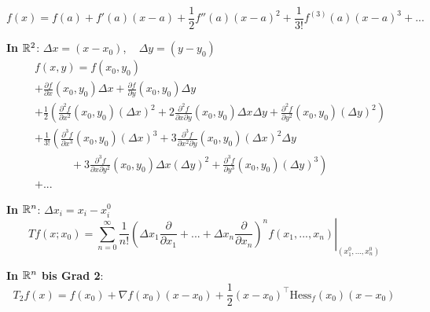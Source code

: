 \[
    f(x) = f(a) + f'(a)(x-a) + \frac{1}{2} f''(a)(x-a)^2 + \frac{1}{3!} f^{(3)}(a)(x-a)^3 + ...
\]

\textbf{In $\mathbb{R}^2$}: $\Delta x = (x - x_0)$, ~ $\Delta y = (y - y_0)$
\begin{align*}
    \; & f(x, y) =f(x_0, y_0)\\ &+ \frac{\partial f}{\partial x}(x_0,y_0) \Delta x + \frac{\partial f}{\partial y}(x_0,y_0) \Delta y\\
    &+ \frac{1}{2} \left(\frac{\partial^2 f}{\partial x^2}(x_0,y_0) (\Delta x)^2 + 2\frac{\partial^2 f}{\partial x \partial y}(x_0,y_0) \Delta x \Delta y + \frac{\partial^2 f}{\partial y^2}(x_0,y_0) (\Delta y)^2\right)\\
    &+ \frac{1}{3!} \left(\frac{\partial^3 f}{\partial x^3}(x_0,y_0) (\Delta x)^3 + 3\frac{\partial^3 f}{\partial x^2 \partial y}(x_0,y_0) (\Delta x)^2 \Delta y\right.\\
    &\quad\quad\quad\;+ \left.3\frac{\partial^3 f}{\partial x \partial y^2}(x_0,y_0) \Delta x (\Delta y)^2 + \frac{\partial^3 f}{\partial y^3}(x_0,y_0) (\Delta y)^3\right)\\
    & + ...
\end{align*}

\textbf{In $\mathbb{R}^n$}: $\Delta x_i = x_i - x_i^0$
\[
	Tf(x;x_0) = \left.\sum_{n=0}^\infty \frac{1}{n!}\left(\Delta x_1 \frac{\partial}{\partial x_1} + ... + \Delta x_n \frac{\partial}{\partial x_n} \right)^n 
		f(x_1, ..., x_n)\right|_{(x_1^0,...,x_n^0)}
\]

\textbf{In $\mathbb{R}^n$ bis Grad 2}:
\[
    T_2f(x) = f(x_0) + \nabla f(x_0)	 (x-x_0) + \frac{1}{2} (x-x_0)^\top \text{Hess}_f(x_0) (x-x_0) 
\]

